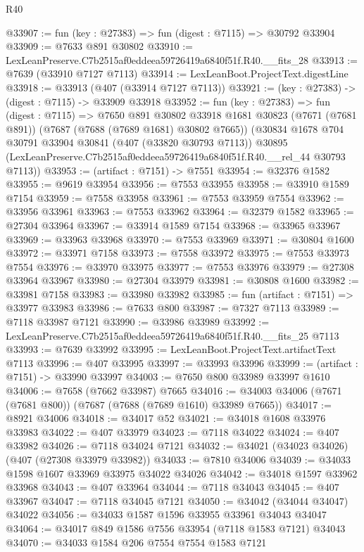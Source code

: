 \begin{lexlean}{R40}
\begin{coremodule}
@33907 := fun (key : @27383) => fun (digest : @7115) => @30792 @33904
@33909 := @7633 @891 @30802
@33910 := LexLeanPreserve.C7b2515af0eddeea59726419a6840f51f.R40.__fits_28
@33913 := @7639 (@33910 @7127 @7113)
@33914 := LexLeanBoot.ProjectText.digestLine
@33918 := @33913 (@407 (@33914 @7127 @7113))
@33921 := (key : @27383) -> (digest : @7115) -> @33909 @33918
@33952 := fun (key : @27383) =>
  fun (digest : @7115) =>
  @7650
    @891
    @30802
    @33918
    @1681
    @30823
    (@7671 (@7681 @891))
    (@7687 (@7688 (@7689 @1681) @30802 @7665))
    (@30834
      @1678
      @704
      @30791
      @33904
      @30841
      (@407 (@33820 @30793 @7113))
      @30895
      (LexLeanPreserve.C7b2515af0eddeea59726419a6840f51f.R40.__rel_44 @30793 @7113))
@33953 := (artifact : @7151) -> @7551
@33954 := @32376 @1582
@33955 := @9619 @33954
@33956 := @7553 @33955
@33958 := @33910 @1589 @7154
@33959 := @7558 @33958
@33961 := @7553 @33959 @7554
@33962 := @33956 @33961
@33963 := @7553 @33962
@33964 := @32379 @1582
@33965 := @27304 @33964
@33967 := @33914 @1589 @7154
@33968 := @33965 @33967
@33969 := @33963 @33968
@33970 := @7553 @33969
@33971 := @30804 @1600
@33972 := @33971 @7158
@33973 := @7558 @33972
@33975 := @7553 @33973 @7554
@33976 := @33970 @33975
@33977 := @7553 @33976
@33979 := @27308 @33964 @33967
@33980 := @27304 @33979
@33981 := @30808 @1600
@33982 := @33981 @7158
@33983 := @33980 @33982
@33985 := fun (artifact : @7151) => @33977 @33983
@33986 := @7633 @800
@33987 := @7327 @7113
@33989 := @7118 @33987 @7121
@33990 := @33986 @33989
@33992 := LexLeanPreserve.C7b2515af0eddeea59726419a6840f51f.R40.__fits_25 @7113
@33993 := @7639 @33992
@33995 := LexLeanBoot.ProjectText.artifactText @7113
@33996 := @407 @33995
@33997 := @33993 @33996
@33999 := (artifact : @7151) -> @33990 @33997
@34003 := @7650 @800 @33989 @33997 @1610
@34006 := @7658 (@7662 @33987) @7665
@34016 := @34003 @34006 (@7671 (@7681 @800)) (@7687 (@7688 (@7689 @1610) @33989 @7665))
@34017 := @8921 @34006
@34018 := @34017 @52
@34021 := @34018 @1608 @33976 @33983
@34022 := @407 @33979
@34023 := @7118 @34022
@34024 := @407 @33982
@34026 := @7118 @34024 @7121
@34032 := @34021 (@34023 @34026) (@407 (@27308 @33979 @33982))
@34033 := @7810 @34006
@34039 := @34033 @1598 @1607 @33969 @33975 @34022 @34026
@34042 := @34018 @1597 @33962 @33968
@34043 := @407 @33964
@34044 := @7118 @34043
@34045 := @407 @33967
@34047 := @7118 @34045 @7121
@34050 := @34042 (@34044 @34047) @34022
@34056 := @34033 @1587 @1596 @33955 @33961 @34043 @34047
@34064 := @34017 @849 @1586 @7556 @33954 (@7118 @1583 @7121) @34043
@34070 := @34033 @1584 @206 @7554 @7554 @1583 @7121

\end{coremodule}
\end{lexlean}
